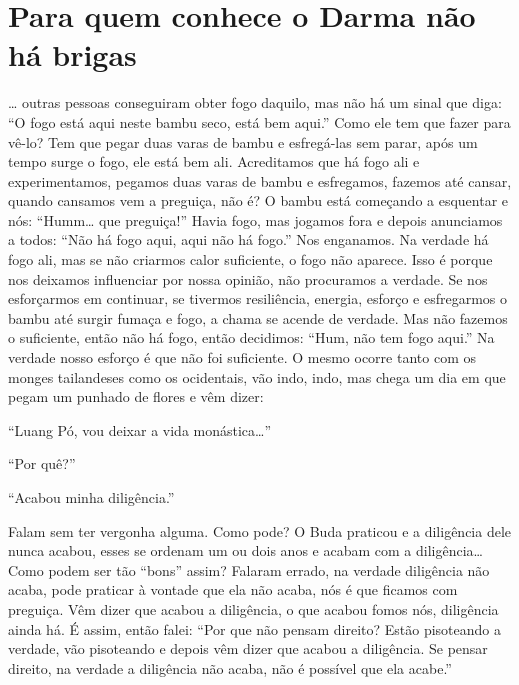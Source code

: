
\chapter{Para quem conhece o Darma não há brigas}
\markright{\theChapterAuthor}

\ldots{} outras pessoas conseguiram obter fogo daquilo, mas não há um
sinal que diga: “O fogo está aqui neste bambu seco, está bem aqui.”
Como ele tem que fazer para vê-lo? Tem que pegar duas varas de bambu e
esfregá-las sem parar, após um tempo surge o fogo, ele está bem ali.
Acreditamos que há fogo ali e experimentamos, pegamos duas varas de
bambu e esfregamos, fazemos até cansar, quando cansamos vem a preguiça,
não é? O bambu está começando a esquentar e nós: “Humm\ldots{} que preguiça!”
Havia fogo, mas jogamos fora e depois anunciamos a todos: “Não há fogo
aqui, aqui não há fogo.” Nos enganamos. Na verdade há fogo ali, mas se
não criarmos calor suficiente, o fogo não aparece. Isso é porque nos
deixamos influenciar por nossa opinião, não procuramos a verdade. Se
nos esforçarmos em continuar, se tivermos resiliência, energia, esforço
e esfregarmos o bambu até surgir fumaça e fogo, a chama se acende de
verdade. Mas não fazemos o suficiente, então não há fogo, então
decidimos: “Hum, não tem fogo aqui.” Na verdade nosso esforço é que não
foi suficiente. O mesmo ocorre tanto com os monges tailandeses como os
ocidentais, vão indo, indo, mas chega um dia em que pegam um punhado de
flores e vêm dizer:

“Luang Pó, vou deixar a vida monástica\ldots{}” 

“Por quê?” 

“Acabou minha diligência.” 

Falam sem ter vergonha alguma. Como pode? O Buda praticou e a
diligência dele nunca acabou, esses se ordenam um ou dois anos e acabam
com a diligência\ldots{} Como podem ser tão “bons” assim? Falaram errado, na
verdade diligência não acaba, pode praticar à vontade que ela não
acaba, nós é que ficamos com preguiça. Vêm dizer que acabou a
diligência, o que acabou fomos nós, diligência ainda há. É assim, então
falei: “Por que não pensam direito? Estão pisoteando a verdade, vão
pisoteando e depois vêm dizer que acabou a diligência. Se pensar
direito, na verdade a diligência não acaba, não é possível que ela
acabe.”

